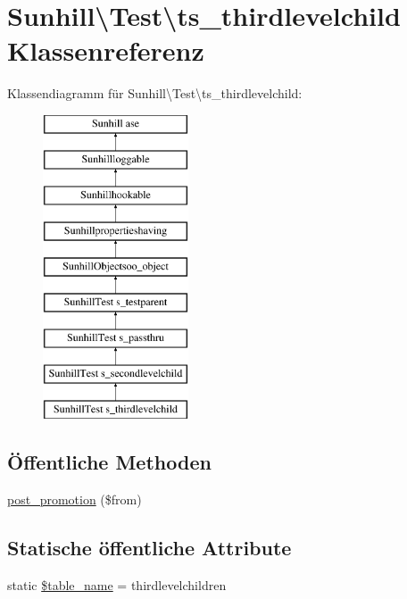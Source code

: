 \hypertarget{classSunhill_1_1Test_1_1ts__thirdlevelchild}{}\section{Sunhill\textbackslash{}Test\textbackslash{}ts\+\_\+thirdlevelchild Klassenreferenz}
\label{classSunhill_1_1Test_1_1ts__thirdlevelchild}
Klassendiagramm für Sunhill\textbackslash{}Test\textbackslash{}ts\+\_\+thirdlevelchild\+:\begin{figure}[H]
\begin{center}
\leavevmode
\includegraphics[height=9.000000cm]{d8/df0/classSunhill_1_1Test_1_1ts__thirdlevelchild}
\end{center}
\end{figure}
\subsection*{Öffentliche Methoden}
\begin{DoxyCompactItemize}
\item 
\hyperlink{classSunhill_1_1Test_1_1ts__thirdlevelchild_a989c880f7f1c301b9d988b0533850d76}{post\+\_\+promotion} (\$from)
\end{DoxyCompactItemize}
\subsection*{Statische öffentliche Attribute}
\begin{DoxyCompactItemize}
\item 
static \hyperlink{classSunhill_1_1Test_1_1ts__thirdlevelchild_a1069614e47f8873fd46d74de86a20dce}{\$table\+\_\+name} = \textquotesingle{}thirdlevelchildren\textquotesingle{}
\end{DoxyCompactItemize}
